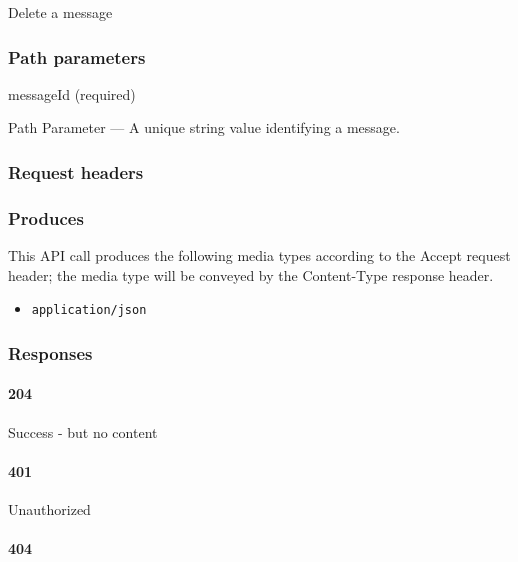 Delete a message

\hypertarget{path-parameters-47}{%
\subsubsection{Path parameters}\label{path-parameters-47}}

messageId (required)

{Path Parameter} --- A unique string value identifying a message.

\hypertarget{request-headers-48}{%
\subsubsection{Request headers}\label{request-headers-48}}

\hypertarget{produces-90}{%
\subsubsection{Produces}\label{produces-90}}

This API call produces the following media types according to the
{Accept} request header; the media type will be conveyed by the
{Content-Type} response header.

\begin{itemize}
\tightlist
\item
  \texttt{application/json}
\end{itemize}

\hypertarget{responses-92}{%
\subsubsection{Responses}\label{responses-92}}

\hypertarget{section-301}{%
\paragraph{204}\label{section-301}}

Success - but no content \protect\hyperlink{}{}

\hypertarget{section-302}{%
\paragraph{401}\label{section-302}}

Unauthorized \protect\hyperlink{}{}

\hypertarget{section-303}{%
\paragraph{404}\label{section-303}}

